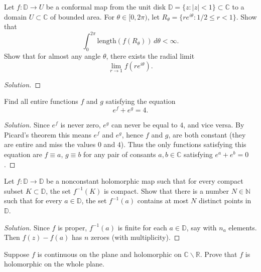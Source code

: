 \documentclass[10pt]{article}
\providecommand{\CC}{\mathbb C}
\providecommand{\inv}{^{-1}}
\newenvironment{soln}{\begin{proof}[Solution]}{\end{proof}}
\begin{document}
\begin{problem}
[2025 A-II-3]
Let $f:\mathbb{D}\to U$ be a conformal map from the unit disk $\mathbb{D}=\{z:|z|<1\}\subset\mathbb{C}$ to a domain $U\subset\mathbb{C}$ of bounded area. For $\theta\in[0,2\pi)$, let $R_\theta=\{re^{i\theta}:1/2\leq r<1\}$. Show that
$$
\int_0^{2\pi}\text{length}(f(R_\theta))\,d\theta<\infty.
$$ Show that for almost any angle $\theta$, there exists the radial limit
$$
\lim_{r\to 1}f(re^{i\theta}).
$$
\end{problem}

\begin{soln}

\end{soln}



\begin{problem}
[2025 J-I-4]
Find all entire functions $f$ and $g$ satisfying the equation
$$
e^f+e^g=4.
$$
\end{problem}

\begin{soln}
    Since $e^f$ is never zero, $e^g$ can never be equal to $4$,
    and vice versa. By Picard's theorem this means $e^f$ and $e^g$,
    hence $f$ and $g$, are both constant
    (they are entire and miss the values $0$ and $4$).
    Thus the only functions satisfying this equation are
    $f\equiv a$, $g\equiv b$ for any pair of consants $a,b\in\CC$
    satisfying $e^a + e^b = 0$.
\end{soln}



\begin{problem}
[2025 J-II-1]
Let $f\colon\mathbb{D}\to\mathbb{D}$ be a nonconstant holomorphic map such that for every compact subset $K\subset\mathbb{D}$, the set $f^{-1}(K)$ is compact. Show that there is a number $N\in\mathbb{N}$ such that for every $a\in\mathbb{D}$, the set $f^{-1}(a)$ contains at most $N$ distinct points in $\mathbb{D}$.
\end{problem}

\begin{soln}
    Since $f$ is proper, $f\inv(a)$ is finite for each $a\in\mathbb D$,
    say with $n_a$ elements. Then $f(z) - f(a)$ has
    $n$ zeroes (with multiplicity).
\end{soln}



\begin{problem}
[2024 J-I-3]
Suppose $f$ is continuous on the plane and holomorphic on $\mathbb{C} \backslash \mathbb{R}$. Prove that $f$ is holomorphic on the whole plane.
\end{problem}
\end{document}
